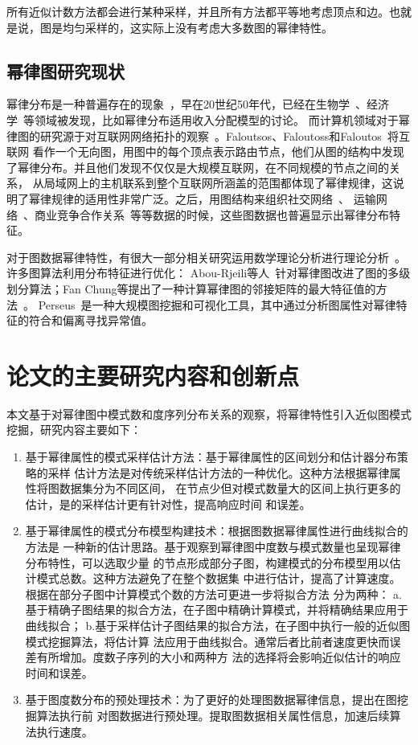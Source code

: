 \documentclass[master]{thesis-uestc}
\begin{document}
    所有近似计数方法都会进行某种采样，并且所有方法都平等地考虑顶点和边。也就是说，图是均匀采样的，这实际上没有考虑大多数图的幂律特性。

\subsection{幂律图研究现状}
    幂律分布是一种普遍存在的现象~\cite{PowerlawBrief}，早在20世纪50年代，已经在生物学~\cite{Stochastic}、经济学~\cite{Zipf}等领域被发现，比如幂律分布适用收入分配模型的讨论。
而计算机领域对于幂律图的研究源于对互联网网络拓扑的观察~\cite{Statistical}。Faloutsos、Faloutoss和Faloutos~\cite{faloutsos1999powerlaw}将互联网
看作一个无向图，用图中的每个顶点表示路由节点，他们从图的结构中发现了幂律分布。并且他们发现不仅仅是大规模互联网，在不同规模的节点之间的关系，
从局域网上的主机联系到整个互联网所涵盖的范围都体现了幂律规律，这说明了幂律规律的适用性非常广泛。之后，用图结构来组织社交网络~\cite{Characterization}、
运输网络~\cite{Transportation}、商业竞争合作关系~\cite{Company}等等数据的时候，这些图数据也普遍显示出幂律分布特征。

    对于图数据幂律特性，有很大一部分相关研究运用数学理论分析进行理论分析~\cite{clauset2007powerlaw}。许多图算法利用分布特征进行优化：
Abou-Rjeili等人~\cite{MultilevelPartitioning}针对幂律图改进了图的多级划分算法；Fan Chung等提出了一种计算幂律图的邻接矩阵的最大特征值的方法~\cite{Eigenvalues}。
Perseus~\cite{Perseus}是一种大规模图挖掘和可视化工具，其中通过分析图属性对幂律特征的符合和偏离寻找异常值。

\section{论文的主要研究内容和创新点}
    本文基于对幂律图中模式数和度序列分布关系的观察，将幂律特性引入近似图模式挖掘，研究内容主要如下：
\begin{enumerate}
    \item 基于幂律属性的模式采样估计方法：基于幂律属性的区间划分和估计器分布策略的采样
    估计方法是对传统采样估计方法的一种优化。这种方法根据幂律属性将图数据集分为不同区间，
    在节点少但对模式数量大的区间上执行更多的估计，是的采样估计更有针对性，提高响应时间
    和误差。
    \item 基于幂律属性的模式分布模型构建技术：根据图数据幂律属性进行曲线拟合的方法是
    一种新的估计思路。基于观察到幂律图中度数与模式数量也呈现幂律分布特性，可以选取少量
    的节点形成部分子图，构建模式的分布模型用以估计模式总数。这种方法避免了在整个数据集
    中进行估计，提高了计算速度。根据在部分子图中计算模式个数的方法可更进一步将拟合方法
    分为两种：
    a.基于精确子图结果的拟合方法，在子图中精确计算模式，并将精确结果应用于曲线拟合；
    b.基于采样估计子图结果的拟合方法，在子图中执行一般的近似图模式挖掘算法，将估计算
    法应用于曲线拟合。通常后者比前者速度更快而误差有所增加。度数子序列的大小和两种方
    法的选择将会影响近似估计的响应时间和误差。
    \item 基于图度数分布的预处理技术：为了更好的处理图数据幂律信息，提出在图挖掘算法执行前
    对图数据进行预处理。提取图数据相关属性信息，加速后续算法执行速度。
\end{enumerate}
    
\end{document}
